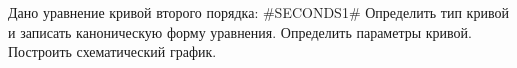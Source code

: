 Дано уравнение кривой второго порядка:
#SECONDS1#
Определить тип кривой и записать каноническую форму уравнения. Определить параметры кривой. Построить схематический график. 
